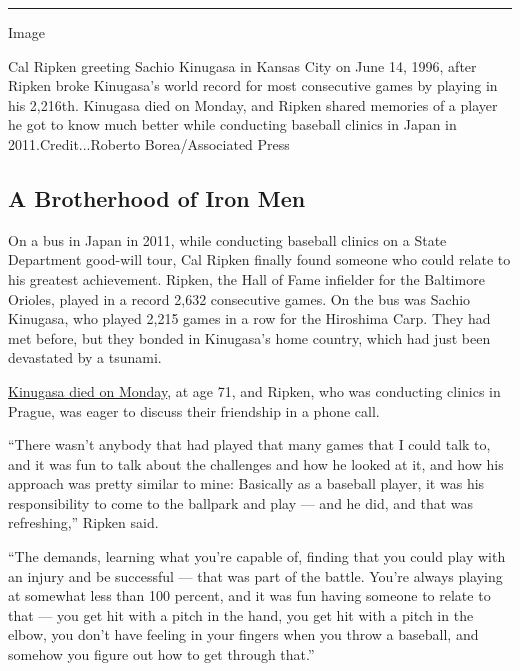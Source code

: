 \begin{center}\rule{0.5\linewidth}{\linethickness}\end{center}

Image

Cal Ripken greeting Sachio Kinugasa in Kansas City on June 14, 1996,
after Ripken broke Kinugasa's world record for most consecutive games by
playing in his 2,216th. Kinugasa died on Monday, and Ripken shared
memories of a player he got to know much better while conducting
baseball clinics in Japan in 2011.Credit...Roberto Borea/Associated
Press

\hypertarget{a-brotherhood-of-iron-men}{%
\subsection{A Brotherhood of Iron Men}\label{a-brotherhood-of-iron-men}}

On a bus in Japan in 2011, while conducting baseball clinics on a State
Department good-will tour, Cal Ripken finally found someone who could
relate to his greatest achievement. Ripken, the Hall of Fame infielder
for the Baltimore Orioles, played in a record 2,632 consecutive games.
On the bus was Sachio Kinugasa, who played 2,215 games in a row for the
Hiroshima Carp. They had met before, but they bonded in Kinugasa's home
country, which had just been devastated by a tsunami.

\href{https://www.nytimes3xbfgragh.onion/2018/04/26/obituaries/sachio-kinugasa-japanese-baseballs-iron-man-is-dead-at-71.html}{Kinugasa
died on Monday}, at age 71, and Ripken, who was conducting clinics in
Prague, was eager to discuss their friendship in a phone call.

``There wasn't anybody that had played that many games that I could talk
to, and it was fun to talk about the challenges and how he looked at it,
and how his approach was pretty similar to mine: Basically as a baseball
player, it was his responsibility to come to the ballpark and play ---
and he did, and that was refreshing,'' Ripken said.

``The demands, learning what you're capable of, finding that you could
play with an injury and be successful --- that was part of the battle.
You're always playing at somewhat less than 100 percent, and it was fun
having someone to relate to that --- you get hit with a pitch in the
hand, you get hit with a pitch in the elbow, you don't have feeling in
your fingers when you throw a baseball, and somehow you figure out how
to get through that.''


